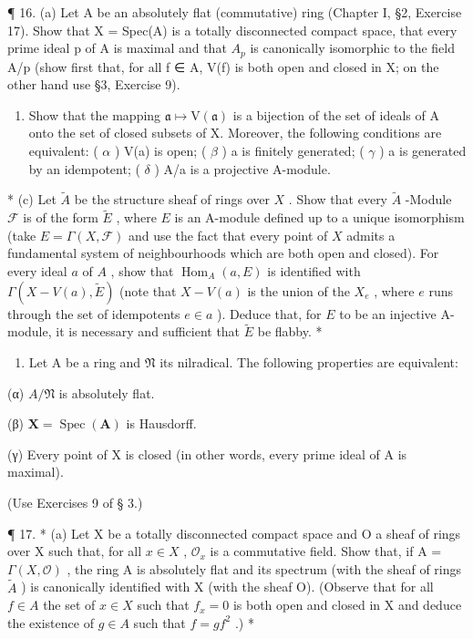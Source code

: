 ¶ 16. (a) Let A be an absolutely flat (commutative) ring (Chapter I, §2, Exercise 17). Show that X = Spec(A) is a totally disconnected compact space, that every prime ideal p of A is maximal and that \(A_{p}\) is canonically isomorphic to the field A/p (show first that, for all f ∈ A, V(f) is both open and closed in X; on the other hand use §3, Exercise 9).

\begin{enumerate}
\def\labelenumi{(\alph{enumi})}
\setcounter{enumi}{1}
\tightlist
\item
  Show that the mapping \(\mathfrak{a}\mapsto\mathrm{V}(\mathfrak{a})\) is a bijection of the set of ideals of A onto the set of closed subsets of X. Moreover, the following conditions are equivalent: ( \(\alpha\) ) V(a) is open; ( \(\beta\) ) a is finitely generated; ( \(\gamma\) ) a is generated by an idempotent; ( \(\delta\) ) A/a is a projective A-module.
\end{enumerate}

* (c) Let \(\tilde{A}\) be the structure sheaf of rings over \(X\) . Show that every \(\tilde{A}\) -Module \(\mathcal{F}\) is of the form \(\tilde{E}\) , where \(E\) is an A-module defined up to a unique isomorphism (take \(E = \Gamma(X, \mathcal{F})\) and use the fact that every point of \(X\) admits a fundamental system of neighbourhoods which are both open and closed). For every ideal \(a\) of \(A\) , show that \(\operatorname{Hom}_A(a, E)\) is identified with \(\Gamma(X - V(a), \tilde{E})\) (note that \(X - V(a)\) is the union of the \(X_e\) , where \(e\) runs through the set of idempotents \(e \in a\) ). Deduce that, for \(E\) to be an injective A-module, it is necessary and sufficient that \(\tilde{E}\) be flabby. *

\begin{enumerate}
\def\labelenumi{(\alph{enumi})}
\setcounter{enumi}{3}
\tightlist
\item
  Let A be a ring and \(\mathfrak{N}\) its nilradical. The following properties are equivalent:
\end{enumerate}

(α) \(A/\mathfrak{N}\) is absolutely flat.

(β) \(\mathbf{X} = \operatorname{Spec}(\mathbf{A})\) is Hausdorff.

(γ) Every point of X is closed (in other words, every prime ideal of A is maximal).

(Use Exercises 9 of § 3.)

¶ 17. * (a) Let X be a totally disconnected compact space and O a sheaf of rings over X such that, for all \(x \in X\) , \(\mathcal{O}_x\) is a commutative field. Show that, if A = \(\Gamma(X, \mathcal{O})\) , the ring A is absolutely flat and its spectrum (with the sheaf of rings \(\tilde{A}\) ) is canonically identified with X (with the sheaf O). (Observe that for all \(f \in A\) the set of \(x \in X\) such that \(f_x = 0\) is both open and closed in X and deduce the existence of \(g \in A\) such that \(f = gf^2\) .) *

